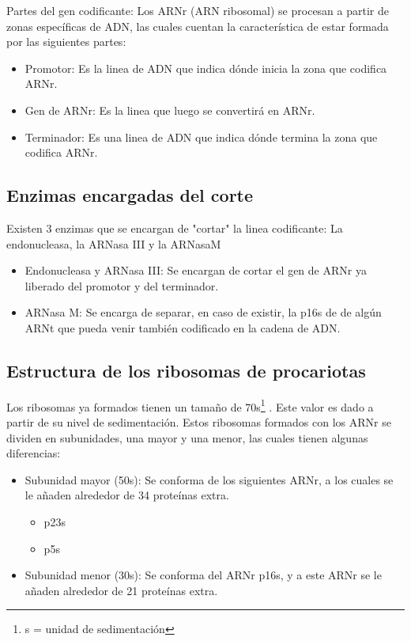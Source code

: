 Partes del gen codificante: Los ARNr (ARN ribosomal) se procesan a partir de zonas específicas de ADN, las cuales cuentan la característica de estar formada por las siguientes partes:

\begin{itemize}
    \item Promotor: Es la linea de ADN que indica dónde inicia la zona que codifica ARNr.
    \item Gen de ARNr: Es la linea que luego se convertirá en ARNr.
    \item Terminador: Es una linea de ADN que indica dónde termina la zona que codifica ARNr.
\end{itemize}

\subsection{Enzimas encargadas del corte}

Existen 3 enzimas que se encargan de "cortar" la linea codificante: La endonucleasa, la ARNasa III y la ARNasaM

\begin{itemize}
    \item Endonucleasa y ARNasa III: Se encargan de cortar el gen de ARNr ya liberado del promotor y del terminador.
    \item ARNasa M: Se encarga de separar, en caso de existir, la p16s de de algún ARNt que pueda venir también codificado en la cadena de ADN.
\end{itemize}

\subsection{Estructura de los ribosomas de procariotas}

Los ribosomas ya formados tienen un tamaño de 70s\footnote{s = unidad de sedimentación} . Este valor es dado a partir de su nivel de sedimentación.
Estos ribosomas formados con los ARNr se dividen en subunidades, una mayor y una menor, las cuales tienen algunas diferencias:

\begin{itemize}
    \item Subunidad mayor (50s): Se conforma de los siguientes ARNr, a los cuales se le añaden alrededor de 34 proteínas extra.
        \begin{itemize}
            \item p23s
            \item p5s
        \end{itemize}
    
    \item Subunidad menor (30s): Se conforma del ARNr p16s, y a este ARNr se le añaden alrededor de 21 proteínas extra. 
\end{itemize}

